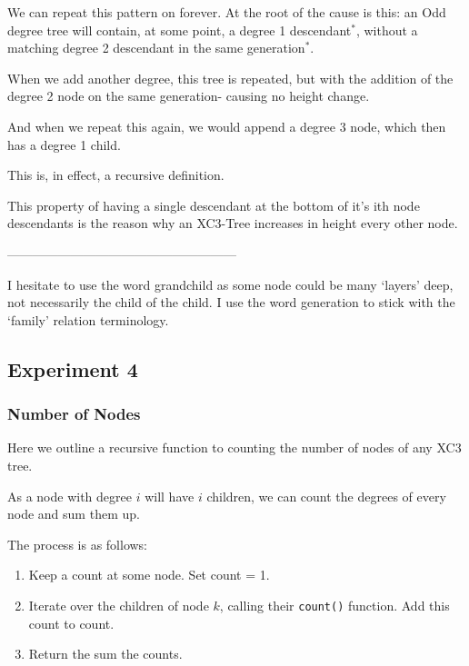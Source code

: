 \documentclass{article}
\begin{document}
We can repeat this pattern on forever. At the root of the cause is this: an Odd degree tree will contain, at some point, a degree 1 descendant$^{*}$, without a matching degree 2 descendant in the same generation$^{*}$. 

When we add another degree, this tree is repeated, but with the addition of the degree 2 node on the same generation- causing no height change.

And when we repeat this again, we would append a degree 3 node, which then has a degree 1 child.

This is, in effect, a recursive definition.

This property of having a single descendant at the bottom of it's ith node descendants is the reason why an XC3-Tree increases in height every other node.

------------------------------------------------------

{
\small
I hesitate to use the word grandchild as some node could be many `layers' deep, not necessarily the child of the child. I use the word generation to stick with the `family' relation terminology.
}


\newpage
\subsection{Experiment 4}

\subsubsection{Number of Nodes}

Here we outline a recursive function to counting the number of nodes of any XC3 tree.

As a node with degree $i$ will have $i$ children, we can count the degrees of every node and sum them up.

The process is as follows:
\begin{enumerate}
    \item Keep a count at some node. Set count = 1.
    \item Iterate over the children of node $k$, calling their \verb|count()| function. Add this count to count.
    \item Return the sum the counts.
\end{enumerate}
\end{document}
